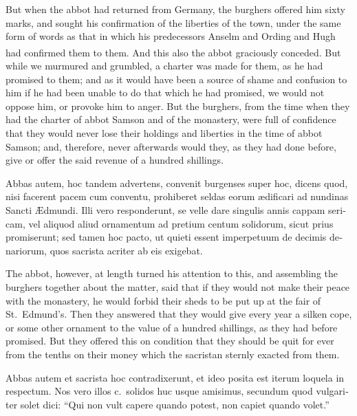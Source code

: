 \documentclass[10pt]{book}
\newcounter{engnote}
\newcommand{\engnotenum}{\textsuperscript{\arabic{engnote}\stepcounter{engnote}}}
\begin{document}
\begin{paracol}{2}
But when the abbot had returned from Germany, the burghers offered him sixty marks, and sought his confirmation of the liberties of the town, under the same form of words as that in which his predecessors Anselm and Ording and Hugh had confirmed them to them. And this also the abbot graciously conceded.\engnotenum{} But while we murmured and grumbled, a charter was made for them, as he had promised to them; and as it would have been a source of shame and confusion to him if he had been unable to do that which he had promised, we would not oppose him, or provoke him to anger. But the burghers, from the time when they had the charter of abbot Samson and of the monastery, were full of confidence that they would never lose their holdings and liberties in the time of abbot Samson; and, therefore, never afterwards would they, as they had done before, give or offer the said revenue of a hundred shillings.

\switchcolumn*

\begin{otherlanguage}{latin}
Abbas autem, hoc tandem advertens, convenit burgenses super hoc, dicens quod, nisi facerent pacem cum conventu, prohiberet seldas eorum \ae{}dificari ad nundinas Sancti \AE{}dmundi. Illi vero responderunt, se velle dare singulis annis cappam sericam, vel aliquod aliud ornamentum ad pretium centum solidorum, sicut prius promiserunt; sed tamen hoc pacto, ut quieti essent imperpetuum de decimis denariorum, quos sacrista acriter ab eis exigebat.
\end{otherlanguage}

\switchcolumn

The abbot, however, at length turned his attention to this, and assembling the burghers together about the matter, said that if they would not make their peace with the monastery, he would forbid their sheds to be put up at the fair of St.\ Edmund's. Then they answered that they would give every year a silken cope, or some other ornament to the value of a hundred shillings, as they had before promised. But they offered this on condition that they should be quit for ever from the tenths on their money which the sacristan sternly exacted from them.

\switchcolumn*

\begin{otherlanguage}{latin}
Abbas autem et sacrista hoc contradixerunt, et ideo posita est iterum loquela in respectum. Nos vero illos c.\ solidos huc usque amisimus, secundum quod vulgariter solet dici: ``Qui non vult capere quando potest, non capiet quando volet.''
\end{otherlanguage}


\end{paracol}
\end{document}

